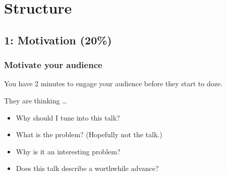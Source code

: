 \documentclass[aspectratio=43,10pt,ucs]{beamer} %
\begin{document}
\section{Structure}
\subsection{1: Motivation (20\%)}
\begin{frame}
  \frametitle{Motivate your audience}

  \alert{You have 2 minutes} to engage your audience before they start
  to doze.

  \vspace*{1em}

  They are thinking \ldots
  \begin{itemize}
  \item Why should I tune into this talk?
  \item What is the problem? (Hopefully not the talk.)
  \item Why is it an interesting problem?
  \item Does this talk describe a worthwhile advance?
  \end{itemize}

  \vspace*{2em}


  \vspace*{1em}


\end{frame}
\end{document}
